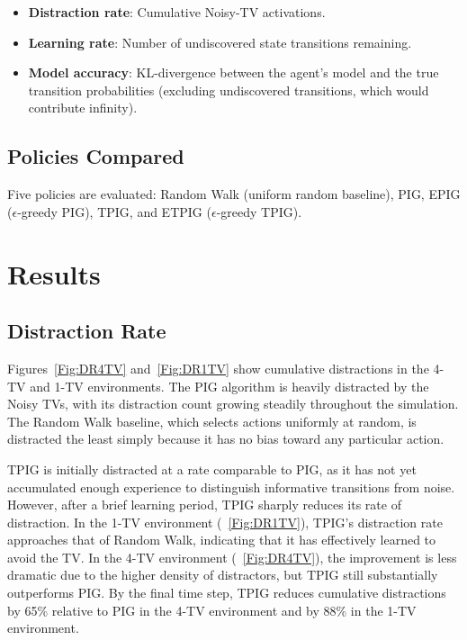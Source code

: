 \documentclass[letterpaper]{article} %
\begin{document}
\begin{itemize}
  \item \textbf{Distraction rate}: Cumulative Noisy-TV activations.
  \item \textbf{Learning rate}: Number of undiscovered state
    transitions remaining.
  \item \textbf{Model accuracy}: KL-divergence between the agent's
    model and the true transition probabilities (excluding
    undiscovered transitions, which would contribute infinity).
\end{itemize}

\subsection{Policies Compared}

Five policies are evaluated: Random Walk (uniform random baseline),
PIG, EPIG ($\epsilon$-greedy PIG), TPIG, and ETPIG ($\epsilon$-greedy
TPIG).

\section{Results}

\subsection{Distraction Rate}

Figures~\ref{Fig:DR4TV} and~\ref{Fig:DR1TV} show
cumulative distractions in the 4-TV and 1-TV environments.  The PIG algorithm is
heavily distracted by the Noisy TVs, with its distraction count
growing steadily throughout the simulation.  The Random Walk baseline,
which selects actions uniformly at random, is distracted the least
simply because it has no bias toward any particular action.

TPIG is initially distracted at a rate comparable to PIG, as it has
not yet accumulated enough experience to distinguish informative
transitions from noise.  However, after a brief learning period, TPIG
sharply reduces its rate of distraction.  In the 1-TV environment
(\figurename~\ref{Fig:DR1TV}), TPIG's distraction rate approaches that
of Random Walk, indicating that it has effectively learned to avoid
the TV.  In the 4-TV environment (\figurename~\ref{Fig:DR4TV}), the
improvement is less dramatic due to the higher density of distractors,
but TPIG still substantially outperforms PIG.
By the final time step, TPIG reduces cumulative distractions by 65\% relative to PIG in the 4-TV environment and by 88\% in the 1-TV environment.
\end{document}
